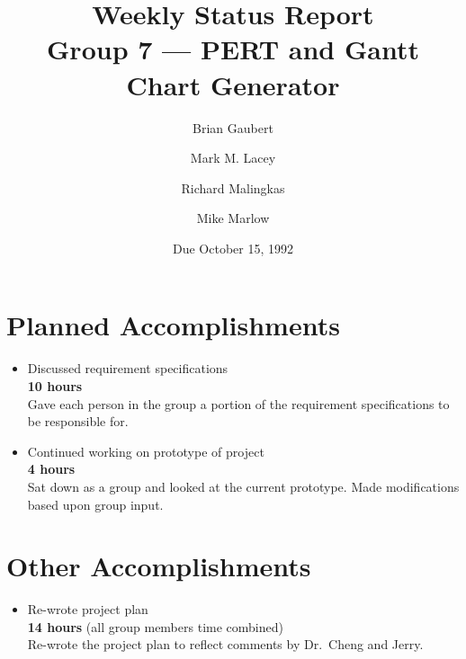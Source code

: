 
\title{Weekly Status Report \\
	Group 7 --- PERT and Gantt Chart Generator}

\author{Brian Gaubert \and Mark M. Lacey \and Richard Malingkas \and
	Mike Marlow}

\date{Due October 15, 1992}

\maketitle

%    
%
%
\section{Planned Accomplishments}
\begin{itemize}
\item Discussed requirement specifications \\
	{\bf 10 hours} \\
	Gave each person in the group a portion of the requirement
specifications to be responsible for.
	
\item Continued working on prototype of project \\
	{\bf 4 hours} \\
	Sat down as a group and looked at the current prototype.  Made
modifications based upon group input.
\end{itemize}

%
%   
%
\section{Other Accomplishments}
\begin{itemize}
\item Re-wrote project plan \\
	{\bf 14 hours} (all group members time combined) \\
	Re-wrote the project plan to reflect comments by Dr.\ Cheng
and Jerry.
\end{itemize}

